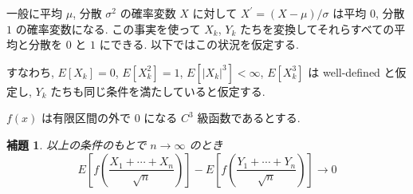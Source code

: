 \documentclass[12pt,twoside]{jarticle}
\theoremstyle{jplain}
\newtheorem{lemma}[theorem]{補題}
\theoremstyle{jplain}
\theoremstyle{jplain}
\numberwithin{theorem}{section}
\numberwithin{equation}{section}
\numberwithin{figure}{section}
\numberwithin{table}{section}
\begin{document}
一般に平均 $\mu$, 分散 $\sigma^2$ の確率変数 $X$ に対して $X^\prime=(X-\mu)/\sigma$ は平均 $0$, 分散 $1$ の確率変数になる. この事実を使って $X_k$, $Y_k$ たちを変換してそれらすべての平均と分散を $0$ と $1$ にできる. 以下ではこの状況を仮定する.

すなわち, $E[X_k]=0$, $E[X_k^2]=1$, $E[|X_k|^3]< \infty$, $E[X_k^3]$ は well-defined と仮定し, $Y_k$ たちも同じ条件を満たしていると仮定する.

$f(x)$ は有限区間の外で $0$ になる $C^3$ 級函数であるとする.

\begin{lemma}
  以上の条件のもとで $n\to\infty$ のとき
  $$
  E\left[f\left(\frac{X_1+\cdots+X_n}{\sqrt n}\right)\right]-
  E\left[f\left(\frac{Y_1+\cdots+Y_n}{\sqrt n}\right)\right]
  \to 0
  $$
\end{lemma}
\end{document}
